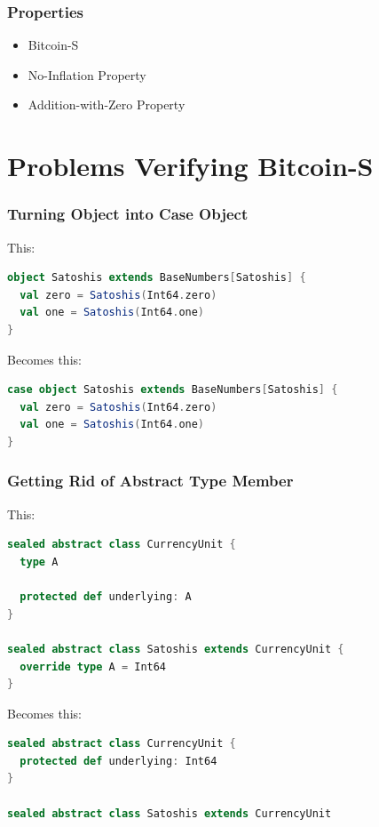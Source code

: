 \documentclass{beamer}
\begin{document}
\begin{frame}
\frametitle{Properties}
\begin{itemize}
  \item Bitcoin-S
  \item No-Inflation Property
  \item Addition-with-Zero Property
\end{itemize}
\end{frame}


\section{Problems Verifying Bitcoin-S}


\begin{frame}[fragile]
\frametitle{Turning Object into Case Object}
This:
\begin{lstlisting}[language=Scala]
object Satoshis extends BaseNumbers[Satoshis] {
  val zero = Satoshis(Int64.zero)
  val one = Satoshis(Int64.one)
}
\end{lstlisting}

Becomes this:
\begin{lstlisting}[language=Scala]
case object Satoshis extends BaseNumbers[Satoshis] {
  val zero = Satoshis(Int64.zero)
  val one = Satoshis(Int64.one)
}
\end{lstlisting}
\end{frame}


\begin{frame}[fragile]
\frametitle{Getting Rid of Abstract Type Member}
This:
\begin{lstlisting}[language=Scala]
sealed abstract class CurrencyUnit {
  type A

  protected def underlying: A
}

sealed abstract class Satoshis extends CurrencyUnit {
  override type A = Int64
}
\end{lstlisting}

Becomes this:
\begin{lstlisting}[language=Scala]
sealed abstract class CurrencyUnit {
  protected def underlying: Int64
}

sealed abstract class Satoshis extends CurrencyUnit
\end{lstlisting}
\end{frame}
\end{document}
